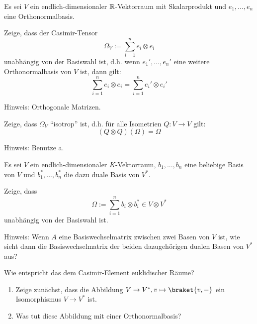 
\begin{sheet}

\begin{problem}[title={Casimir-Elemente von euklidischen Räumen}]
Es sei $V$ ein endlich-dimensionaler $\mathbb{R}$-Vektorraum mit Skalarprodukt und $e_1, ..., e_n$ eine Orthonormalbasis.

\begin{subproblem}
Zeige, dass der Casimir-Tensor
\[\Omega_V := \sum_{i=1}^n e_i\otimes e_i\]
unabhängig von der Basiswahl ist, d.h. wenn $e_1', ..., e_n'$ eine weitere Orthonormalbasis von $V$ ist, dann gilt:
\[\sum_{i=1}^n e_i\otimes e_i = \sum_{i=1}^n e_i'\otimes e_i'\]

Hinweis: Orthogonale Matrizen.
\end{subproblem}

\begin{subproblem}
Zeige, dass $\Omega_V$ \enquote{isotrop} ist, d.h. für alle Isometrien $Q: V\to V$ gilt:
\[(Q\otimes Q)(\Omega) = \Omega\]

Hinweis: Benutze a.
\end{subproblem}
\end{problem}

\begin{problem}[title={Casimir-Elemente allgemein}]
Es sei $V$ ein endlich-dimensionaler $K$-Vektorraum, $b_1, ..., b_n$ eine beliebige Basis von $V$ und $b_1^\ast, ..., b_n^\ast$ die dazu duale Basis von $V^\ast$.

\begin{subproblem}
Zeige, dass
\[\Omega := \sum_{i=1}^n b_i \otimes b_i^\ast \in V\otimes V^\ast\]
unabhängig von der Basiswahl ist.

Hinweis: Wenn $A$ eine Basiswechselmatrix zwischen zwei Basen von $V$ ist, wie sieht dann die Basiswechselmatrix der beiden dazugehörigen dualen Basen von $V^\ast$ aus?
\end{subproblem}
\begin{subproblem}
Wie entspricht das dem Casimir-Element euklidischer Räume?
\begin{enumerate}[label=\roman*.)]
\item Zeige zunächst, dass die Abbildung $V\to V^\ast, v\mapsto \braket{v,-}$ ein Isomorphismus $V\to V^\ast$ ist.
\item Was tut diese Abbildung mit einer Orthonormalbasis?
\end{enumerate}
\end{subproblem}
\end{problem}


\end{sheet}
